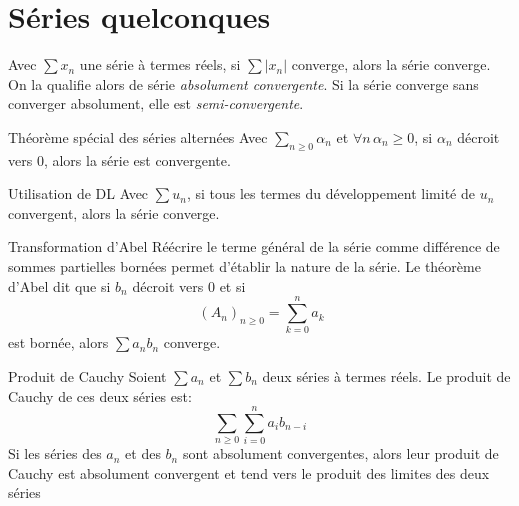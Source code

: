 \documentclass[french, a4paper, 11pt, twocolumn]{article}
\newcommand{\po}{\left(}         %
\newcommand{\pf}{\right)}        %
\newcommand{\pof}[1]{\po #1 \pf} %
\begin{document}
\section{Séries quelconques}
\begin{definition}
  Avec \(\sum x_{n}\) une série à termes  réels, si \(\sum\left| x_{n}\right|\) converge, alors la série converge. On la qualifie alors de série \emph{absolument convergente}. Si la série converge sans converger absolument, elle est \emph{semi-convergente}.
\end{definition}

\begin{theoreme}{Théorème spécial des séries alternées}
  Avec \(\sum_{n\geqslant 0} \alpha_{n}\) et \(\forall n\, \alpha_{n}\geqslant 0\),
  si \(\alpha_{n}\) décroit vers \(0\), alors la série est convergente.
\end{theoreme}

\begin{theoreme}{Utilisation de DL}
  Avec \(\sum u_{n}\), si tous les termes du développement limité de \(u_{n}\) convergent, alors la série converge.
\end{theoreme}

\begin{theoreme}{Transformation d'Abel}
  Réécrire le terme général de la série comme différence de sommes partielles bornées permet d'établir la nature de la série.
  \tcblower
  Le théorème d'Abel dit que si \(b_{n}\) décroit vers \(0\) et si \[\ \pof{A_{n}}_{n\geqslant 0}=\sum_{k=0}^n a_k\] est bornée, alors \(\sum a_{n}b_{n}\) converge.
\end{theoreme}

\begin{theoreme}{Produit de Cauchy}
  Soient \(\sum a_{n}\) et \(\sum b_{n}\) deux séries à termes réels. Le produit de Cauchy de ces deux séries est:
  \[\sum_{n\geqslant 0}\sum_{i=0}^{n}a_{i}b_{n-i}\]
  Si les séries des \(a_{n}\) et des \(b_{n}\) sont absolument convergentes, alors leur produit de Cauchy est absolument convergent et tend vers le produit des limites des deux séries
\end{theoreme}
\end{document}
